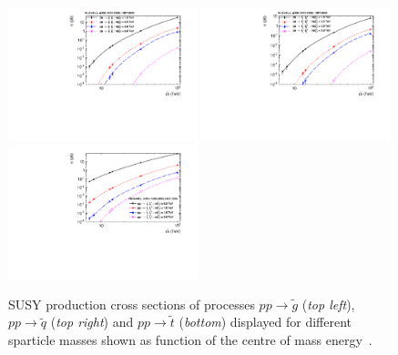 \begin{figure}[!t]
  \centering
  \begin{minipage}[c]{1.\textwidth}
    \begin{center}
      \includegraphics[width=0.49\textwidth]{figures/gluino_xsec.pdf}  
      \includegraphics[width=0.49\textwidth]{figures/squark_xsec.pdf} \\
      \includegraphics[width=0.49\textwidth]{figures/stop_xsec.pdf}
    \end{center}
  \end{minipage}
  \caption{SUSY production cross sections of processes $pp \rightarrow \tilde{g}$ (\textit{top left}), $pp \rightarrow \tilde{q}$ (\textit{top right}) and $pp \rightarrow \tilde{t}$ (\textit{bottom}) displayed for different sparticle masses shown as function of the centre of mass energy~\cite{Kramer:2012bx, Borschensky:2014cia}.}
  \label{fig:susy_cross_sec}
\end{figure}
